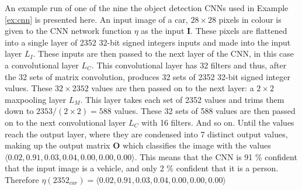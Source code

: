 \begin{example}
	\label{ex:runcnn}
	An example run of one of the nine the object detection \acp{CNN} used in Example \ref{ex:cnn} is presented here.
	An input image of a car, $28 \times 28$ pixels in colour is given to the \ac{CNN} network function $\eta$ as the input \textbf{I}.
	These pixels are flattened into a single layer of 2352 32-bit signed integers inputs and made into the input layer $L_I$.
	These inputs are then passed to the next layer of the \ac{CNN}, in this case a convolutional layer $L_C$.
	This convolutional layer has 32 filters and thus, after the 32 sets of matrix convolution, produces 32 sets of 2352 32-bit signed integer values.
	These $32 \times 2352$ values are then passed on to the next layer: a $2 \times 2$ maxpooling layer $L_M$.
	This layer takes each set of 2352 values and trims them down to $2353 / (2 \times 2) = 588$ values.
	These 32 sets of 588 values are then passed on to the next convolutional layer $L_C$ with 16 filters.
	And so on.
	Until the values reach the output layer, where they are condensed into 7 distinct output values, making up the output matrix \textbf{O} which classifies the image with the values $\langle 0.02, 0.91, 0.03, 0.04, 0.00, 0.00, 0.00 \rangle$.
	This means that the \ac{CNN} is 91 \% confident that the input image is a vehicle, and only 2 \% confident that it is a person.
	Therefore $\eta(2352_{car}) = \langle 0.02, 0.91, 0.03, 0.04, 0.00, 0.00, 0.00 \rangle$
\end{example}














